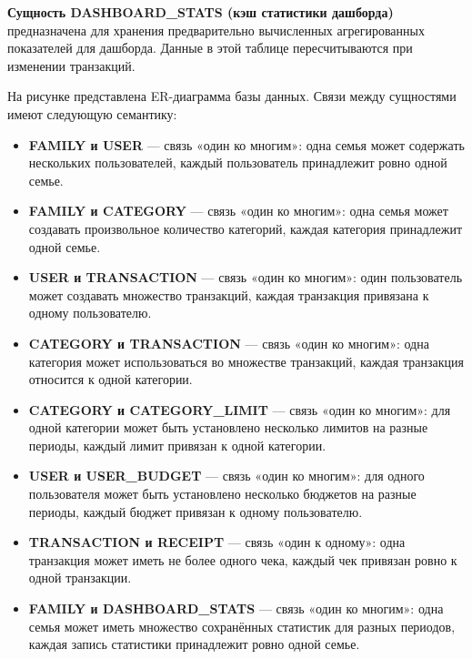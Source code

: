 \textbf{Сущность DASHBOARD\_STATS (кэш статистики дашборда)} предназначена для хранения предварительно вычисленных агрегированных показателей для дашборда. Данные в этой таблице пересчитываются при изменении транзакций.

На рисунке представлена ER-диаграмма базы данных. Связи между сущностями имеют следующую семантику:

\begin{itemize}
    \item \textbf{FAMILY и USER} — связь «один ко многим»: одна семья может содержать нескольких пользователей, каждый пользователь принадлежит ровно одной семье.
    
    \item \textbf{FAMILY и CATEGORY} — связь «один ко многим»: одна семья может создавать произвольное количество категорий, каждая категория принадлежит одной семье.
    
    \item \textbf{USER и TRANSACTION} — связь «один ко многим»: один пользователь может создавать множество транзакций, каждая транзакция привязана к одному пользователю.
    
    \item \textbf{CATEGORY и TRANSACTION} — связь «один ко многим»: одна категория может использоваться во множестве транзакций, каждая транзакция относится к одной категории.
    
    \item \textbf{CATEGORY и CATEGORY\_LIMIT} — связь «один ко многим»: для одной категории может быть установлено несколько лимитов на разные периоды, каждый лимит привязан к одной категории.
    
    \item \textbf{USER и USER\_BUDGET} — связь «один ко многим»: для одного пользователя может быть установлено несколько бюджетов на разные периоды, каждый бюджет привязан к одному пользователю.
    
    \item \textbf{TRANSACTION и RECEIPT} — связь «один к одному»: одна транзакция может иметь не более одного чека, каждый чек привязан ровно к одной транзакции.
    
    \item \textbf{FAMILY и DASHBOARD\_STATS} — связь «один ко многим»: одна семья может иметь множество сохранённых статистик для разных периодов, каждая запись статистики принадлежит ровно одной семье.
\end{itemize}

